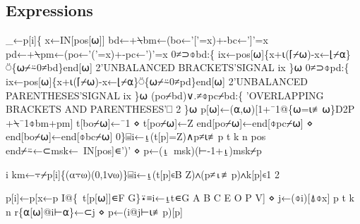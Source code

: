 \documentclass{article}%
\begin{document}
\subsection{Expressions}

\nwenddocs{}\endmoddef\nwstartdeflinemarkup{}\nwenddeflinemarkup
_←p[i]\{
        x←IN[pos[⍵]]
        bd←+⍀bm←(bo←'['=x)+-bc←']'=x
        pd←+⍀pm←(po←'('=x)+-pc←')'=x
        0≠⊃⌽bd:\{
                ix←pos[⍵]\{x+⍳(⌈⌿⍵)-x←⌊⌿⍺\}⍥\{⍵⌿⍨0≠bd\}end[⍵]
                2'UNBALANCED BRACKETS'SIGNAL ix
        \}⍵
        0≠⊃⌽pd:\{
                ix←pos[⍵]\{x+⍳(⌈⌿⍵)-x←⌊⌿⍺\}⍥\{⍵⌿⍨0≠pd\}end[⍵]
                2'UNBALANCED PARENTHESES'SIGNAL ix
        \}⍵
        (po⌿bd)∨.≠⌽pc⌿bd:\{
                'OVERLAPPING BRACKETS AND PARENTHESES'⎕ 2
        \}⍵
        p[⍵]←(⍺,⍵)[1+¯1@\{⍵=⍳≢⍵\}D2P +⍀¯1⌽bm+pm]
        t[bo⌿⍵]←¯1 ⋄ t[po⌿⍵]←Z
        end[po⌿⍵]←end[⌽pc⌿⍵] ⋄ end[bo⌿⍵]←end[⌽bc⌿⍵]
0\}⌸i←⍸(t[p]=Z)∧p≠⍳≢p
t k n pos end⌿⍨←⊂msk←~IN[pos]∊')' ⋄ p←(⍸~msk)(⊢-1+⍸)msk⌿p
\nwendcode{}\nwdocspar

\nwenddocs{}\endmoddef\nwstartdeflinemarkup{}\nwenddeflinemarkup
i km←⍪⌿p[i]\{(⍺⍪⍵)(0,1∨⍵)\}⌸i←⍸(t[p]∊B Z)∧(p≠⍳≢p)∧k[p]∊1 2
\nwendcode{}\nwdocspar

\nwenddocs{}\endmoddef\nwstartdeflinemarkup{}\nwenddeflinemarkup
p[i]←p[x←p I@\{~t[p[⍵]]∊F G\}⍣≡i←⍸t∊G A B C E O P V] ⋄ j←(⌽i)[⍋⌽x]
p t k n r\{⍺[⍵]@i⊢⍺\}←⊂j ⋄ p←(i@j⊢⍳≢p)[p]
\nwendcode{}\nwdocspar
\end{document}
